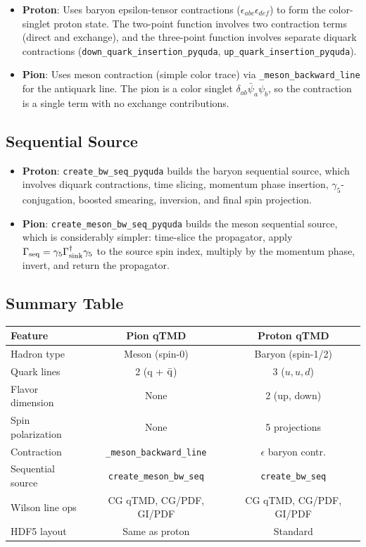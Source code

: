 \documentclass[11pt,a4paper]{article}
\begin{document}
\begin{itemize}[nosep]
  \item \textbf{Proton}: Uses baryon epsilon-tensor contractions
        ($\epsilon_{abc}\epsilon_{def}$) to form the color-singlet proton
        state.  The two-point function involves two contraction terms (direct
        and exchange), and the three-point function involves separate diquark
        contractions (\texttt{down\_quark\_insertion\_pyquda},
        \texttt{up\_quark\_insertion\_pyquda}).
  \item \textbf{Pion}: Uses meson contraction (simple color trace) via
        \verb|_meson_backward_line| for the antiquark line.  The pion
        is a color singlet $\delta_{ab}\bar\psi_a\psi_b$, so the contraction is
        a single term with no exchange contributions.
\end{itemize}

\subsection{Sequential Source}

\begin{itemize}[nosep]
  \item \textbf{Proton}: \verb|create_bw_seq_pyquda| builds the baryon
        sequential source, which involves diquark contractions, time slicing,
        momentum phase insertion, $\gamma_5$-conjugation, boosted smearing,
        inversion, and final spin projection.
  \item \textbf{Pion}: \verb|create_meson_bw_seq_pyquda| builds the meson
        sequential source, which is considerably simpler: time-slice the
        propagator, apply $\Gamma_{\rm seq} = \gamma_5
        \Gamma_{\rm sink}^\dagger \gamma_5$ to the source spin index, multiply
        by the momentum phase, invert, and return the propagator.
\end{itemize}

\subsection{Summary Table}

\begin{center}
\begin{tabular}{l|c|c}
\hline
\textbf{Feature} & \textbf{Pion qTMD} & \textbf{Proton qTMD} \\
\hline
Hadron type & Meson (spin-0) & Baryon (spin-1/2) \\
Quark lines & 2 (q + $\bar{\rm q}$) & 3 ($u,u,d$) \\
Flavor dimension & None & 2 (up, down) \\
Spin polarization & None & 5 projections \\
Contraction & \verb|_meson_backward_line| & $\epsilon$ baryon contr. \\
Sequential source & \verb|create_meson_bw_seq| & \verb|create_bw_seq| \\
Wilson line ops & CG qTMD, CG/PDF, GI/PDF & CG qTMD, CG/PDF, GI/PDF \\
HDF5 layout & Same as proton & Standard \\
\hline
\end{tabular}
\end{center}
\end{document}
